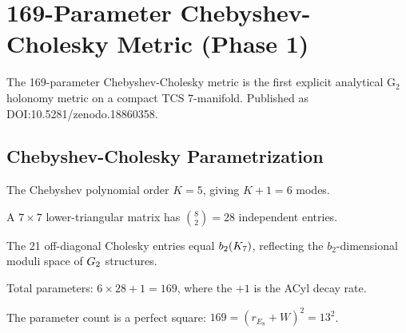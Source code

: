 \chapter{169-Parameter Chebyshev-Cholesky Metric (Phase 1)}\label{chap:chebyshev_metric}

The 169-parameter Chebyshev-Cholesky metric is the first explicit analytical G$_2$
holonomy metric on a compact TCS 7-manifold. Published as DOI:10.5281/zenodo.18860358.

\section{Chebyshev-Cholesky Parametrization}

\begin{definition}\label{def:chebyshev_K}
    \leanok
    The Chebyshev polynomial order $K = 5$, giving $K + 1 = 6$ modes.
\end{definition}

\begin{definition}\label{def:cholesky_entries}
    \leanok
    A $7 \times 7$ lower-triangular matrix has $\binom{8}{2} = 28$ independent entries.
\end{definition}

\begin{theorem}[Off-diagonal = $b_2$]\label{thm:cholesky_offdiag_b2}
    \leanok
    The 21 off-diagonal Cholesky entries equal $b_2(K_7)$, reflecting
    the $b_2$-dimensional moduli space of $G_2$ structures.
\end{theorem}

\begin{theorem}\label{thm:169_params}
    \leanok
    Total parameters: $6 \times 28 + 1 = 169$, where the $+1$ is the ACyl decay rate.
\end{theorem}

\begin{theorem}[$169 = 13^2 = \alpha_{\mathrm{sum}}^2$]\label{thm:169_square}
    \leanok
    The parameter count is a perfect square: $169 = (r_{E_8} + W)^2 = 13^2$.
\end{theorem}

